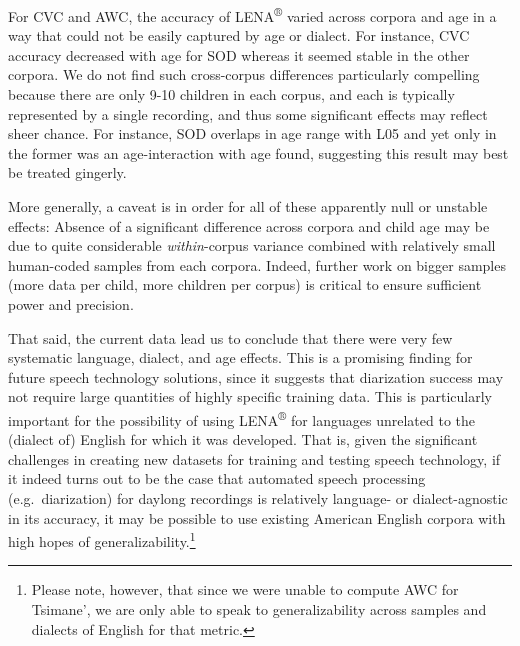 \documentclass[english,floatsintext,man]{apa6}
\begin{document}
For CVC and AWC, the accuracy of LENA\textsuperscript{®} varied across
corpora and age in a way that could not be easily captured by age or
dialect. For instance, CVC accuracy decreased with age for SOD whereas
it seemed stable in the other corpora. We do not find such cross-corpus
differences particularly compelling because there are only 9-10 children
in each corpus, and each is typically represented by a single recording,
and thus some significant effects may reflect sheer chance. For
instance, SOD overlaps in age range with L05 and yet only in the former
was an age-interaction with age found, suggesting this result may best
be treated gingerly.

More generally, a caveat is in order for all of these apparently null or
unstable effects: Absence of a significant difference across corpora and
child age may be due to quite considerable \emph{within}-corpus variance
combined with relatively small human-coded samples from each corpora.
Indeed, further work on bigger samples (more data per child, more
children per corpus) is critical to ensure sufficient power and
precision.

That said, the current data lead us to conclude that there were very few
systematic language, dialect, and age effects. This is a promising
finding for future speech technology solutions, since it suggests that
diarization success may not require large quantities of highly specific
training data. This is particularly important for the possibility of
using LENA\textsuperscript{®} for languages unrelated to the (dialect
of) English for which it was developed. That is, given the significant
challenges in creating new datasets for training and testing speech
technology, if it indeed turns out to be the case that automated speech
processing (e.g.~diarization) for daylong recordings is relatively
language- or dialect-agnostic in its accuracy, it may be possible to use
existing American English corpora with high hopes of
generalizability.\footnote{Please note, however, that since we were unable to compute AWC for Tsimane', we are only able to speak to generalizability across samples and dialects of English for that metric.}
\end{document}
